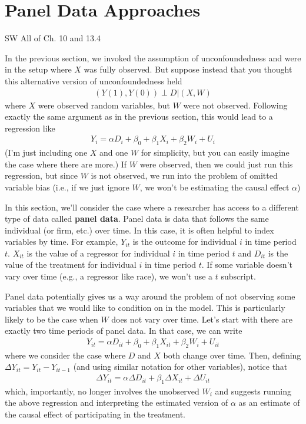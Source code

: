 \documentclass[
  letterpaper,
  DIV=11,
  numbers=noendperiod]{scrreprt}
\begin{document}
\section{Panel Data Approaches}\label{panel-data-approaches}

SW All of Ch. 10 and 13.4

In the previous section, we invoked the assumption of unconfoundedness
and were in the setup where \(X\) was fully observed. But suppose
instead that you thought this alternative version of unconfoundedness
held \begin{align*}
  (Y(1),Y(0)) \perp D | (X,W)
\end{align*} where \(X\) were observed random variables, but \(W\) were
not observed. Following exactly the same argument as in the previous
section, this would lead to a regression like \begin{align*}
  Y_i = \alpha D_i + \beta_0 + \beta_1 X_i + \beta_2 W_i + U_i
\end{align*} (I'm just including one \(X\) and one \(W\) for simplicity,
but you can easily imagine the case where there are more.) If \(W\) were
observed, then we could just run this regression, but since \(W\) is not
observed, we run into the problem of omitted variable bias (i.e., if we
just ignore \(W\), we won't be estimating the causal effect \(\alpha\))

In this section, we'll consider the case where a researcher has access
to a different type of data called \textbf{panel data}. Panel data is
data that follows the same individual (or firm, etc.) over time. In this
case, it is often helpful to index variables by time. For example,
\(Y_{it}\) is the outcome for individual \(i\) in time period \(t\).
\(X_{it}\) is the value of a regressor for individual \(i\) in time
period \(t\) and \(D_{it}\) is the value of the treatment for individual
\(i\) in time period \(t\). If some variable doesn't vary over time
(e.g., a regressor like race), we won't use a \(t\) subscript.

Panel data potentially gives us a way around the problem of not
observing some variables that we would like to condition on in the
model. This is particularly likely to be the case when \(W\) does not
vary over time. Let's start with there are exactly two time periods of
panel data. In that case, we can write \begin{align*}
  Y_{it} = \alpha D_{it} + \beta_0 + \beta_1 X_{it} + \beta_2 W_i + U_{it}
\end{align*} where we consider the case where \(D\) and \(X\) both
change over time. Then, defining \(\Delta Y_{it} = Y_{it} - Y_{it-1}\)
(and using similar notation for other variables), notice that
\begin{align*}
  \Delta Y_{it} = \alpha \Delta D_{it} + \beta_1 \Delta X_{it} + \Delta U_{it}
\end{align*} which, importantly, no longer involves the unobserved
\(W_i\) and suggests running the above regression and interpreting the
estimated version of \(\alpha\) as an estimate of the causal effect of
participating in the treatment.
\end{document}
